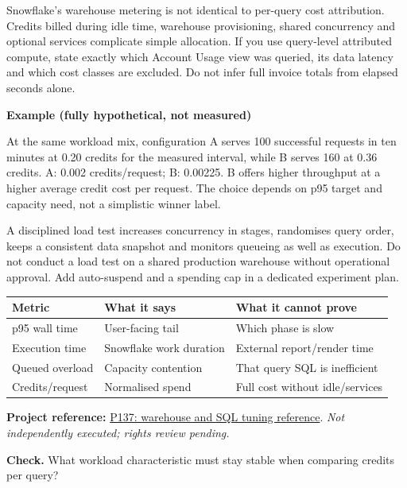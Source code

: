 \documentclass[11pt,twoside]{article}
\newcommand{\repo}[2]{\par\begingroup\fontsize{8.0}{9.6}\selectfont\sffamily\color{inkgray}\textbf{Project reference:} \href{#2}{#1}. \textit{Not independently executed; rights review pending.}\par\endgroup}
\begin{document}
Snowflake's warehouse metering is not identical to per-query cost attribution. Credits billed during idle time, warehouse provisioning, shared concurrency and optional services complicate simple allocation. If you use query-level attributed compute, state exactly which Account Usage view was queried, its data latency and which cost classes are excluded. Do not infer full invoice totals from elapsed seconds alone.
\begin{whitebox}\textbf{Example (fully hypothetical, not measured)}\par
At the same workload mix, configuration A serves 100 successful requests in ten minutes at 0.20 credits for the measured interval, while B serves 160 at 0.36 credits. A: 0.002 credits/request; B: 0.00225. B offers higher throughput at a higher average credit cost per request. The choice depends on p95 target and capacity need, not a simplistic winner label.\end{whitebox}
A disciplined load test increases concurrency in stages, randomises query order, keeps a consistent data snapshot and monitors queueing as well as execution. Do not conduct a load test on a shared production warehouse without operational approval. Add auto-suspend and a spending cap in a dedicated experiment plan.
\begin{center}\renewcommand{\arraystretch}{1.08}\begin{tabularx}{\linewidth}{@{}p{31mm}XX@{}}\toprule
\textbf{Metric}&\textbf{What it says}&\textbf{What it cannot prove}\\\midrule
p95 wall time&User-facing tail&Which phase is slow\\
Execution time&Snowflake work duration&External report/render time\\
Queued overload&Capacity contention&That query SQL is inefficient\\
Credits/request&Normalised spend&Full cost without idle/services\\\bottomrule\end{tabularx}\end{center}
\repo{P137: warehouse and SQL tuning reference}{https://github.com/subhamay-bhattacharyya/snowflake-de-query-optimization}
\textbf{Check.} What workload characteristic must stay stable when comparing credits per query?
\newpage
\end{document}
